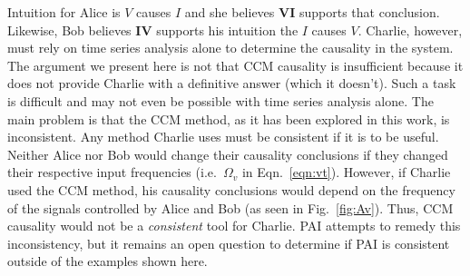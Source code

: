 \documentclass[a4paper,11pt,twocolumn]{article}
\begin{document}
Intuition for Alice is $V$ causes $I$ and she believes $\mathbf{VI}$ supports that conclusion.  Likewise, Bob believes $\mathbf{IV}$ supports his intuition the $I$ causes $V$.  Charlie, however, must rely on time series analysis alone to determine the causality in the system.  The argument we present here is not that CCM causality is insufficient because it does not provide Charlie with a definitive answer (which it doesn't).  Such a task is difficult and may not even be possible with time series analysis alone\cite{Pearl2000}.  The main problem is that the CCM method, as it has been explored in this work, is inconsistent.  Any method Charlie uses must be consistent if it is to be useful.  Neither Alice nor Bob would change their causality conclusions if they changed their respective input frequencies (i.e.\ $\Omega_v$ in Eqn.\ \ref{eqn:vt}).  However, if Charlie used the CCM method, his causality conclusions would depend on the frequency of the signals controlled by Alice and Bob (as seen in Fig.\ \ref{fig:Av}).  Thus, CCM causality would not be a {\em consistent} tool for Charlie.  PAI attempts to remedy this inconsistency, but it remains an open question to determine if PAI is consistent outside of the examples shown here.




\end{document}
